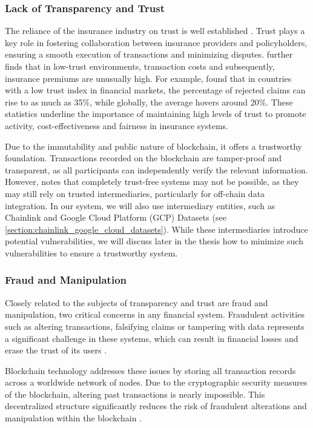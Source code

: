\subsubsection{Lack of Transparency and Trust}
The reliance of the insurance industry on trust is well established \textcite{courbage2021trust}. Trust plays a key role in fostering collaboration between insurance providers and policyholders, ensuring a smooth execution of transactions and minimizing disputes. \textcite{guiso2012trust} further finds that in low-trust environments, transaction costs and subsequently, insurance premiums are unusually high. For example, \textcite{gennaioli2022trust} found that in countries with a low trust index in financial markets, the percentage of rejected claims can rise to as much as 35\%, while globally, the average hovers around 20\%. These statistics underline the importance of maintaining high levels of trust to promote activity, cost-effectiveness and fairness in insurance systems.

Due to the immutability and public nature of blockchain, it offers a trustworthy foundation. Transactions recorded on the blockchain are tamper-proof and transparent, as all participants can independently verify the relevant information. However, \textcite{hawlitschek2018limits} notes that completely trust-free systems may not be possible, as they may still rely on trusted intermediaries, particularly for off-chain data integration. In our system, we will also use intermediary entities, such as Chainlink and Google Cloud Platform (GCP) Datasets (see \cref{section:chainlink_google_cloud_datasets}). While these intermediaries introduce potential vulnerabilities, we will discuss later in the thesis how to minimize such vulnerabilities to ensure a trustworthy system.
 
\subsubsection{Fraud and Manipulation}
Closely related to the subjects of transparency and trust are fraud and manipulation, two critical concerns in any financial system. Fraudulent activities such as altering transactions, falsifying claims or tampering with data represents a significant challenge in these systems, which can result in financial losses and erase the trust of its users \autocite{Ahmad2024Fraud}.

Blockchain technology addresses these issues by storing all transaction records across a worldwide network of nodes. Due to the cryptographic security measures of the blockchain, altering past transactions is nearly impossible. This decentralized structure significantly reduces the risk of fraudulent alterations and manipulation within the blockchain \autocite{eigelshoven2021cryptocurrency}.

